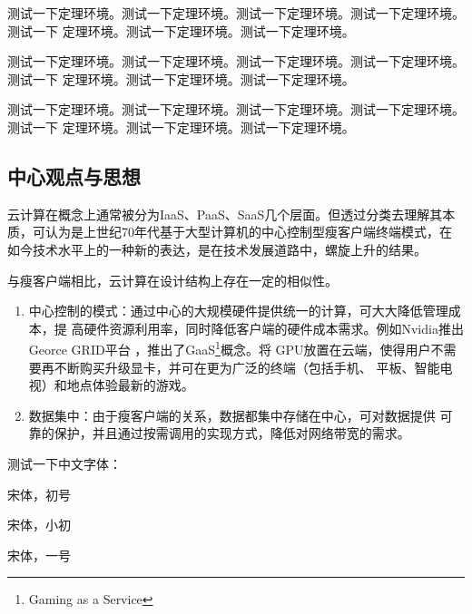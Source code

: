 \blindtext

\begin{exercise}
    测试一下定理环境。测试一下定理环境。测试一下定理环境。测试一下定理环境。测试一下
    定理环境。测试一下定理环境。测试一下定理环境。
\end{exercise}

\blindtext

\begin{exercise}
    测试一下定理环境。测试一下定理环境。测试一下定理环境。测试一下定理环境。测试一下
    定理环境。测试一下定理环境。测试一下定理环境。
\end{exercise}

\begin{algorithm}
    测试一下定理环境。测试一下定理环境。测试一下定理环境。测试一下定理环境。测试一下
    定理环境。测试一下定理环境。测试一下定理环境。
\end{algorithm}

\subsection{中心观点与思想}

云计算在概念上通常被分为IaaS、PaaS、SaaS几个层面。但透过分类去理解其本
质，可认为是上世纪70年代基于大型计算机的中心控制型瘦客户端终端模式，在
如今技术水平上的一种新的表达，是在技术发展道路中，螺旋上升的结果。

与瘦客户端相比，云计算在设计结构上存在一定的相似性。

\begin{enumerate}
    \item 中心控制的模式：通过中心的大规模硬件提供统一的计算，可大大降低管理成本，提
    高硬件资源利用率，同时降低客户端的硬件成本需求。例如Nvidia推出Georce GRID平台
    \cite{NVIDIAGRID}，推出了GaaS\footnote{Gaming as a Service}概念。将
    GPU放置在云端，使得用户不需要再不断购买升级显卡，并可在更为广泛的终端（包括手机、
    平板、智能电视）和地点体验最新的游戏。
    \item 数据集中：由于瘦客户端的关系，数据都集中存储在中心，可对数据提供
    可靠的保护，并且通过按需调用的实现方式，降低对网络带宽的需求。
\end{enumerate}




测试一下中文字体：

{\songti{} 宋体，初号}

{\songti{} 宋体，小初}

{\songti{} 宋体，一号}

